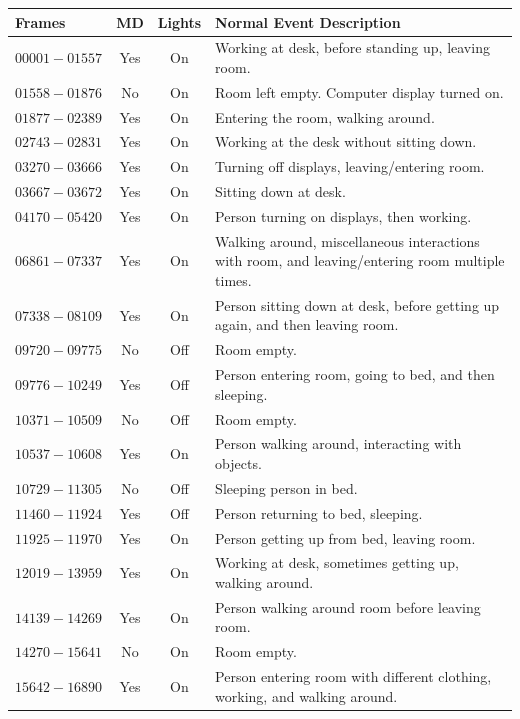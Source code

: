 \begin{table}
	\centering
	\begin{tabular}{ | l | c | c | p{9.5cm} |}
	\toprule
	\textbf{Frames} & \textbf{MD} & \textbf{Lights} & \textbf{Normal Event Description} \\
	\midrule
	$00001 - 01557$ & Yes & On & Working at desk, before standing up, leaving room. \\
	$01558 - 01876$ & No  & On & Room left empty. Computer display turned on. \\
	$01877 - 02389$ & Yes & On & Entering the room, walking around. \\
	$02743 - 02831$ & Yes & On & Working at the desk without sitting down. \\
	$03270 - 03666$ & Yes & On & Turning off displays, leaving/entering room. \\
	$03667 - 03672$ & Yes & On & Sitting down at desk. \\
	$04170 - 05420$ & Yes & On & Person turning on displays, then working. \\
	$06861 - 07337$ & Yes & On & Walking around, miscellaneous interactions with room, and leaving/entering room multiple times. \\
	$07338 - 08109$ & Yes & On & Person sitting down at desk, before getting up again, and then leaving room. \\
	$09720 - 09775$ & No  & Off  & Room empty. \\
	$09776 - 10249$ & Yes & Off  & Person entering room, going to bed, and then sleeping. \\
	$10371 - 10509$ & No  & Off  & Room empty. \\
	$10537 - 10608$ & Yes & On 	 & Person walking around, interacting with objects. \\
	$10729 - 11305$ & No  & Off  & Sleeping person in bed. \\
	$11460 - 11924$ & Yes & Off  & Person returning to bed, sleeping. \\
	$11925 - 11970$ & Yes & On   & Person getting up from bed, leaving room. \\
	$12019 - 13959$ & Yes & On   & Working at desk, sometimes getting up, walking around. \\
	$14139 - 14269$ & Yes & On   & Person walking around room before leaving room. \\
	$14270 - 15641$ & No  & On   & Room empty. \\
	$15642 - 16890$ & Yes & On   & Person entering room with different clothing, working, and walking around. \\

\end{tabular}
\end{table}
